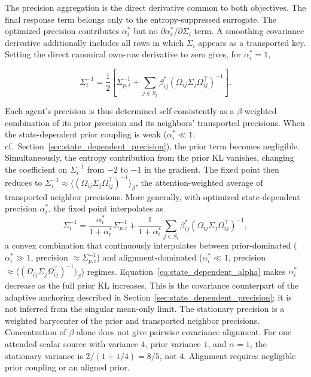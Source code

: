 \documentclass[twoside,11pt]{article}
\begin{document}
The precision aggregation is the direct derivative common to both objectives. The final response term belongs only to the entropy-suppressed surrogate. The optimized precision contributes $\alpha_i^*$ but no $\partial\alpha_i^*/\partial\Sigma_i$ term. A smoothing covariance derivative additionally includes all rows in which $\Sigma_i$ appears as a transported key. Setting the direct canonical own-row derivative to zero gives, for $\alpha_i^*=1$,

\begin{equation}
\Sigma_i^{-1}
=\frac{1}{2}
\left[
\Sigma_{p,i}^{-1}
+ \sum_{j\in S_i} \beta_{ij}^*
(\Omega_{ij}\Sigma_j\Omega_{ij}^\top)^{-1}
\right].
\label{eq:sigma_fixed_point_main}
\end{equation}

Each agent's precision is thus determined self-consistently as a
$\beta$-weighted combination of its prior precision and its neighbors'
transported precisions. When the state-dependent prior coupling is
weak ($\alpha_i^* \ll 1$; cf.\ Section~\ref{sec:state_dependent_precision}),
the prior term becomes negligible. Simultaneously, the entropy
contribution from the prior KL vanishes, changing the coefficient on
$\Sigma_i^{-1}$ from $-2$ to $-1$ in the gradient. The fixed point then
reduces to
$\Sigma_i^{-1} \approx
\langle(\Omega_{ij}\Sigma_j\Omega_{ij}^\top)^{-1}\rangle_\beta$,
the attention-weighted average of transported neighbor precisions.
More generally, with optimized state-dependent precision $\alpha_i^*$, the fixed point interpolates as
%
\begin{equation}
\Sigma_i^{-1}
= \frac{\alpha_i^*}{1+\alpha_i^*} \Sigma_{p,i}^{-1}
+ \frac{1}{1+\alpha_i^*}\sum_{j\in S_i} \beta_{ij}^*
(\Omega_{ij}\Sigma_j\Omega_{ij}^\top)^{-1},
\label{eq:sigma_fixed_point_alpha}
\end{equation}
%
a convex combination that continuously interpolates between
prior-dominated ($\alpha_i^* \gg 1$, precision $\approx \Sigma_{p,i}^{-1}$)
and alignment-dominated ($\alpha_i^* \ll 1$, precision
$\approx \langle(\Omega_{ij}\Sigma_j\Omega_{ij}^\top)^{-1}\rangle_\beta$)
regimes. Equation~\eqref{eq:state_dependent_alpha} makes $\alpha_i^*$ decrease as the full prior KL increases. This is the covariance counterpart of the adaptive anchoring described in Section~\ref{sec:state_dependent_precision}; it is not inferred from the singular mean-only limit.
The stationary precision is a weighted barycenter of the prior and transported neighbor precisions. Concentration of $\beta$ alone does not give pairwise covariance alignment. For one attended scalar source with variance $4$, prior variance $1$, and $\alpha=1$, the stationary variance is $2/(1+1/4)=8/5$, not $4$. Alignment requires negligible prior coupling or an aligned prior.
\end{document}

